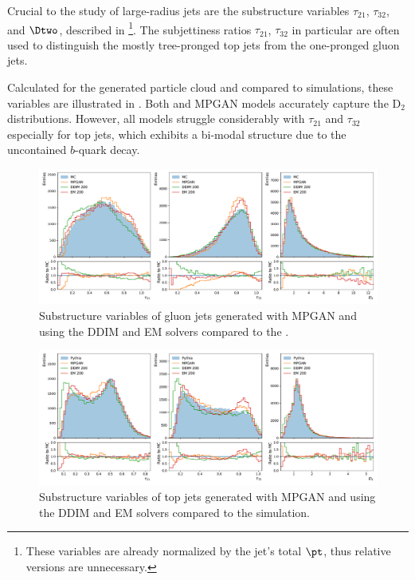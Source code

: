 Crucial to the study of large-radius jets are the substructure variables $\tau_{21}$, $\tau_{32}$, and $\Dtwo$, described in \footnote{These variables are already normalized by the jet's total $\pt$, thus relative versions are unnecessary.}.
The subjettiness ratios $\tau_{21}$, $\tau_{32}$ in particular are often used to distinguish the mostly tree-pronged top jets from the one-pronged gluon jets.

Calculated for the generated particle cloud and compared to \pythia simulations, these variables are illustrated in .
Both \pcjedi and MPGAN models accurately capture the $\text{D}_2$ distributions.
However, all models struggle considerably with $\tau_{21}$ and $\tau_{32}$ especially for top jets, which exhibits a bi-modal structure due to the uncontained $b$-quark decay.

\begin{figure}[hbpt]
    \centering
    \includegraphics[width=1.\textwidth]{Figures/jet_generation/jedi/gluon/jet_substructure_rel.pdf}
    \caption{Substructure variables of gluon jets generated with MPGAN and \pcjedi using the DDIM and EM solvers compared to the \pythia.}
    \label{fig:substructure_gluon}
\end{figure}

\begin{figure}[hbpt]
    \centering
    \includegraphics[width=1.\textwidth]{Figures/jet_generation/jedi/top/jet_substructure_rel.pdf}
    \caption{Substructure variables of top jets generated with MPGAN and \pcjedi using the DDIM and EM solvers compared to the \pythia simulation.}
    \label{fig:substructure_top}
\end{figure}


